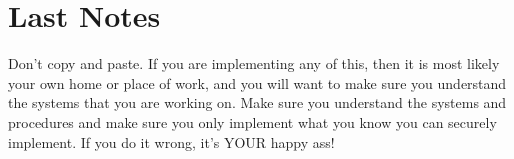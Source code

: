 \documentclass[letterpaper,twoside,12pt]{book}
\begin{document}












\appendix


%

\backmatter
\chapter{Last Notes}
Don't copy and paste.  If you are implementing any of this, then it is most
likely your own home or place of work, and you will want to make sure you
understand the systems that you are working on.  Make sure you understand the
systems and procedures and make sure you only implement what you know you can
securely implement.  If you do it wrong, it's YOUR happy ass!
\end{document}

